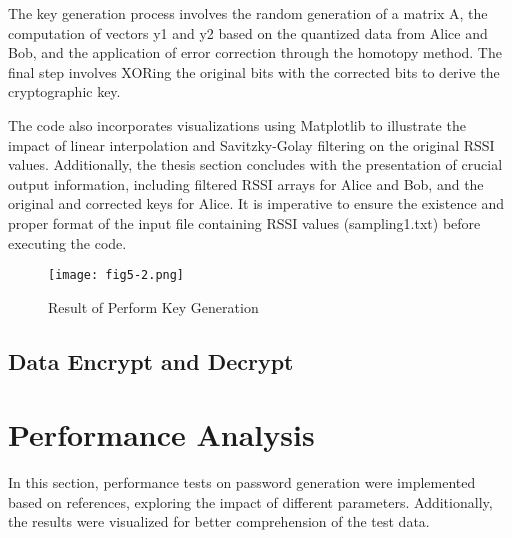 The key generation process involves the random generation of a matrix A, the computation of vectors y1 and y2 based on the quantized data from Alice and Bob, and the application of error correction through the homotopy method. The final step involves XORing the original bits with the corrected bits to derive the cryptographic key.

The code also incorporates visualizations using Matplotlib to illustrate the impact of linear interpolation and Savitzky-Golay filtering on the original RSSI values. Additionally, the thesis section concludes with the presentation of crucial output information, including filtered RSSI arrays for Alice and Bob, and the original and corrected keys for Alice. It is imperative to ensure the existence and proper format of the input file containing RSSI values (sampling1.txt) before executing the code.
\begin{figure}
  \centering
  \texttt{[image: fig5-2.png]}
  \caption{Result of Perform Key Generation}
  \label{fig:5-2}
\end{figure}

\subsection{Data Encrypt and Decrypt}

\section{Performance Analysis}
In this section, performance tests on password generation were implemented based on references, exploring the impact of different parameters. Additionally, the results were visualized for better comprehension of the test data.
